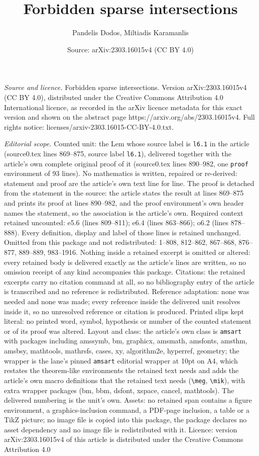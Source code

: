 \documentclass[10pt,a4paper]{amsart}
\title[Forbidden sparse intersections]{Forbidden sparse intersections}
\author{Pandelis Dodos, Miltiadis Karamanlis}
\date{Source: arXiv:2303.16015v4 (CC BY 4.0)}
\begin{document}
\maketitle

\noindent\emph{Source and licence.} Forbidden sparse intersections. Version arXiv:2303.16015v4 (CC BY 4.0), distributed under the Creative Commons Attribution 4.0 International licence, as recorded in the arXiv licence metadata for this exact version and shown on the abstract page https://arxiv.org/abs/2303.16015v4. Full rights notice: licenses/arxiv-2303.16015-CC-BY-4.0.txt.\par\smallskip

\noindent\textit{Editorial scope.} Counted unit: the Lem whose source label is \texttt{l6.1} in the article (source0.tex lines 869--875, source label \texttt{l6.1}), delivered together with the article's own complete original proof of it (source0.tex lines 890--982, one \texttt{proof} environment of 93 lines). No mathematics is written, repaired or re-derived: statement and proof are the article's own text line for line. The proof is detached from the statement in the source: the article states the result at lines 869--875 and prints its proof at lines 890--982, and the proof environment's own header names the statement, so the association is the article's own. Required context retained uncounted: e5.6 (lines 809--811); e6.4 (lines 863--866); o6.2 (lines 878--888). Every definition, display and label of those lines is retained unchanged. Omitted from this package and not redistributed: 1--808, 812--862, 867--868, 876--877, 889--889, 983--1916. Nothing inside a retained excerpt is omitted or altered: every retained body is delivered exactly as the article's lines are written, so no omission receipt of any kind accompanies this package. Citations: the retained excerpts carry no citation command at all, so no bibliography entry of the article is transcribed and no reference is redistributed. Reference adaptation: none was needed and none was made; every reference inside the delivered unit resolves inside it, so no unresolved reference or citation is produced. Printed slips kept literal: no printed word, symbol, hypothesis or number of the counted statement or of its proof was altered. Layout and class: the article's own class is \texttt{amsart} with packages including amssymb, bm, graphicx, amsmath, amsfonts, amsthm, amsbsy, mathtools, mathrsfs, cases, xy, algorithm2e, hyperref, geometry; the wrapper is the lane's pinned \texttt{amsart} editorial wrapper at 10pt on A4, which restates the theorem-like environments the retained text needs and adds the article's own macro definitions that the retained text needs (\texttt{\textbackslash meg}, \texttt{\textbackslash mik}), with extra wrapper packages (bm, bbm, dsfont, xspace, cancel, mathtools). The delivered numbering is the unit's own. Assets: no retained span contains a figure environment, a graphics-inclusion command, a PDF-page inclusion, a table or a TikZ picture; no image file is copied into this package, the package declares no asset dependency and no image file is redistributed with it. Licence: version arXiv:2303.16015v4 of this article is distributed under the Creative Commons Attribution 4.0 
\end{document}
